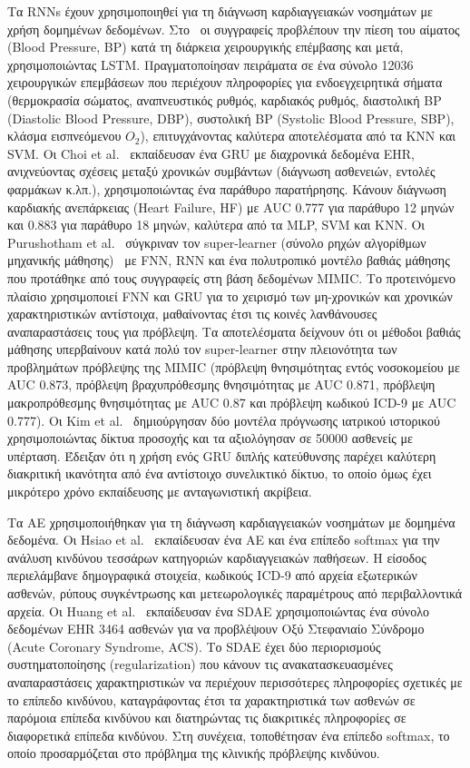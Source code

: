 Τα RNNs έχουν χρησιμοποιηθεί για τη διάγνωση καρδιαγγειακών νοσημάτων με χρήση δομημένων δεδομένων.
Στο~\cite{gopalswamy2017deep} οι συγγραφείς προβλέπουν την πίεση του αίματος (Blood Pressure, BP) κατά τη διάρκεια χειρουργικής επέμβασης και μετά, χρησιμοποιώντας LSTM\@.
Πραγματοποίησαν πειράματα σε ένα σύνολο 12036 χειρουργικών επεμβάσεων που περιέχουν πληροφορίες για ενδοεγχειρητικά σήματα (θερμοκρασία σώματος, αναπνευστικός ρυθμός, καρδιακός ρυθμός, διαστολική BP (Diastolic Blood Pressure, DBP), συστολική BP (Systolic Blood Pressure, SBP), κλάσμα εισπνεόμενου $O_2$), επιτυγχάνοντας καλύτερα αποτελέσματα από τα KNN και SVM\@.
Οι Choi et al.~\cite{choi2016using} εκπαίδευσαν ένα GRU με διαχρονικά δεδομένα EHR, ανιχνεύοντας σχέσεις μεταξύ χρονικών συμβάντων (διάγνωση ασθενειών, εντολές φαρμάκων κ.λπ.), χρησιμοποιώντας ένα παράθυρο παρατήρησης.
Κάνουν διάγνωση καρδιακής ανεπάρκειας (Heart Failure, HF) με AUC 0.777 για παράθυρο 12 μηνών και 0.883 για παράθυρο 18 μηνών, καλύτερα από τα MLP, SVM και KNN\@.
Οι Purushotham et al.~\cite{purushotham2018benchmarking} σύγκριναν τον super-learner (σύνολο ρηχών αλγορίθμων μηχανικής μάθησης)~\cite{polley2010super} με FNN, RNN και ένα πολυτροπικό μοντέλο βαθιάς μάθησης που προτάθηκε από τους συγγραφείς στη βάση δεδομένων MIMIC\@.
Το προτεινόμενο πλαίσιο χρησιμοποιεί FNN και GRU για το χειρισμό των μη-χρονικών και χρονικών χαρακτηριστικών αντίστοιχα, μαθαίνοντας έτσι τις κοινές λανθάνουσες αναπαραστάσεις τους για πρόβλεψη.
Τα αποτελέσματα δείχνουν ότι οι μέθοδοι βαθιάς μάθησης υπερβαίνουν κατά πολύ τον super-learner στην πλειονότητα των προβλημάτων πρόβλεψης της MIMIC (πρόβλεψη θνησιμότητας εντός νοσοκομείου με AUC 0.873, πρόβλεψη βραχυπρόθεσμης θνησιμότητας με AUC 0.871, πρόβλεψη μακροπρόθεσμης θνησιμότητας με AUC 0.87 και πρόβλεψη κωδικού ICD-9 με AUC 0.777).
Οι Kim et al.~\cite{kim2017highrisk} δημιούργησαν δύο μοντέλα πρόγνωσης ιατρικού ιστορικού χρησιμοποιώντας δίκτυα προσοχής και τα αξιολόγησαν σε 50000 ασθενείς με υπέρταση.
Έδειξαν ότι η χρήση ενός GRU διπλής κατεύθυνσης παρέχει καλύτερη διακριτική ικανότητα από ένα αντίστοιχο συνελικτικό δίκτυο, το οποίο όμως έχει μικρότερο χρόνο εκπαίδευσης με ανταγωνιστική ακρίβεια.

Τα ΑΕ χρησιμοποιήθηκαν για τη διάγνωση καρδιαγγειακών νοσημάτων με δομημένα δεδομένα.
Οι Hsiao et al.~\cite{hsiao2016deep} εκπαίδευσαν ένα ΑΕ και ένα επίπεδο softmax για την ανάλυση κινδύνου τεσσάρων κατηγοριών καρδιαγγειακών παθήσεων.
Η είσοδος περιελάμβανε δημογραφικά στοιχεία, κωδικούς ICD-9 από αρχεία εξωτερικών ασθενών, ρύπους συγκέντρωσης και μετεωρολογικές παραμέτρους από περιβαλλοντικά αρχεία.
Οι Huang et al.~\cite{huang2018regularized} εκπαίδευσαν ένα SDAE χρησιμοποιώντας ένα σύνολο δεδομένων EHR 3464 ασθενών για να προβλέψουν Οξύ Στεφανιαίο Σύνδρομο (Acute Coronary Syndrome, ACS).
Το SDAE έχει δύο περιορισμούς συστηματοποίησης (regularization) που κάνουν τις ανακατασκευασμένες αναπαραστάσεις χαρακτηριστικών να περιέχουν περισσότερες πληροφορίες σχετικές με το επίπεδο κινδύνου, καταγράφοντας έτσι τα χαρακτηριστικά των ασθενών σε παρόμοια επίπεδα κινδύνου και διατηρώντας τις διακριτικές πληροφορίες σε διαφορετικά επίπεδα κινδύνου.
Στη συνέχεια, τοποθέτησαν ένα επίπεδο softmax, το οποίο προσαρμόζεται στο πρόβλημα της κλινικής πρόβλεψης κινδύνου.

